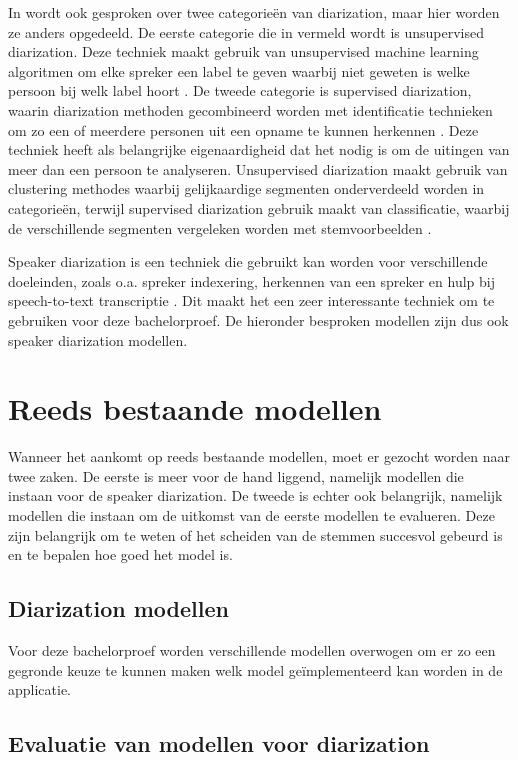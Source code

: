In \textcite{Khoma2023} wordt ook gesproken over twee categorieën van diarization, maar hier worden ze anders opgedeeld. De eerste categorie die in \textcite{Khoma2023} vermeld wordt is unsupervised diarization. Deze techniek maakt gebruik van unsupervised machine learning algoritmen om elke spreker een label te geven waarbij niet geweten is welke persoon bij welk label hoort \autocite{Khoma2023}. De tweede categorie is supervised diarization, waarin diarization methoden gecombineerd worden met identificatie technieken om zo een of meerdere personen uit een opname te kunnen herkennen \autocite{Khoma2023}. Deze techniek heeft als belangrijke eigenaardigheid dat het nodig is om de uitingen van meer dan een persoon te analyseren\autocite{Khoma2023}. Unsupervised diarization maakt gebruik van clustering methodes waarbij gelijkaardige segmenten onderverdeeld worden in categorieën, terwijl supervised diarization gebruik maakt van classificatie, waarbij de verschillende segmenten vergeleken worden met stemvoorbeelden \autocite{Khoma2023}.

Speaker diarization is een techniek die gebruikt kan worden voor verschillende doeleinden, zoals o.a. spreker indexering, herkennen van een spreker en hulp bij speech-to-text transcriptie \autocite{AngueraMiro2012}. Dit maakt het een zeer interessante techniek om te gebruiken voor deze bachelorproef. De hieronder besproken modellen zijn dus ook speaker diarization modellen.

\section{Reeds bestaande modellen}
Wanneer het aankomt op reeds bestaande modellen, moet er gezocht worden naar twee zaken. De eerste is meer voor de hand liggend, namelijk modellen die instaan voor de speaker diarization. De tweede is echter ook belangrijk, namelijk modellen die instaan om de uitkomst van de eerste modellen te evalueren. Deze zijn belangrijk om te weten of het scheiden van de stemmen succesvol gebeurd is en te bepalen hoe goed het model is.

\subsection{Diarization modellen}
Voor deze bachelorproef worden verschillende modellen overwogen om er zo een gegronde keuze te kunnen maken welk model geïmplementeerd kan worden in de applicatie.


\subsection{Evaluatie van modellen voor diarization}
